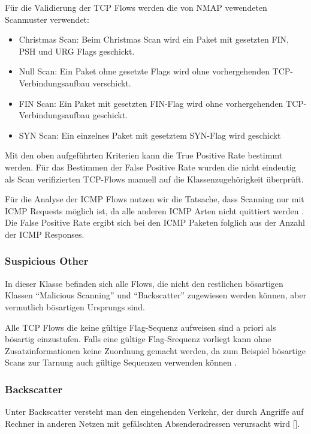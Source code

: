 \documentclass[a4paper]{scrartcl}
\begin{document}
Für die Validierung der TCP Flows werden die von NMAP vewendeten Scanmuster \cite{nmap09} verwendet:
\begin{itemize}
	\item Christmas Scan: Beim Christmas Scan wird ein Paket mit gesetzten FIN, PSH und URG Flags geschickt.
	\item Null Scan: Ein Paket ohne gesetzte Flags wird ohne vorhergehenden TCP-Verbindungsaufbau verschickt. 
	\item FIN Scan: Ein Paket mit gesetzten FIN-Flag wird ohne vorhergehenden TCP-Verbindungsaufbau geschickt.
	\item SYN Scan: Ein einzelnes Paket mit gesetztem SYN-Flag wird geschickt
\end{itemize}
Mit den oben aufgeführten Kriterien kann die True Positive Rate bestimmt werden. 
Für das Bestimmen der False Positive Rate wurden die nicht eindeutig als Scan verifizierten TCP-Flows manuell auf die Klassenzugehörigkeit überprüft.

Für die Analyse der ICMP Flows nutzen wir die Tatsache, dass Scanning nur mit ICMP Requests möglich ist, da alle anderen ICMP Arten nicht quittiert werden \cite{rfc_icmp}. Die False Positive Rate ergibt sich bei den ICMP Paketen folglich aus der Anzahl der ICMP Responses.

\subsubsection{Suspicious Other}
In dieser Klasse befinden sich alle Flows, die nicht den restlichen bösartigen Klassen ``Malicious Scanning'' und ``Backscatter'' zugewiesen werden können, aber vermutlich bösartigen Ursprungs sind. 

Alle TCP Flows die keine gültige Flag-Sequenz aufweisen sind a priori als bösartig einzustufen. Falls eine gültige Flag-Srequenz vorliegt kann ohne Zusatzinformationen keine Zuordnung gemacht werden, da zum Beispiel bösartige Scans zur Tarnung auch gültige Sequenzen verwenden können \cite{nmap09}.

\subsubsection{Backscatter}
Unter Backscatter versteht man den eingehenden Verkehr, der durch Angriffe auf Rechner in anderen Netzen mit gefälschten Absenderadressen verursacht wird []. 
\end{document}

